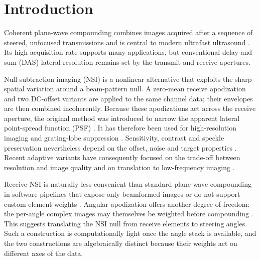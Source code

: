 \documentclass{iopjournal}
\providecommand{\revstart}{}
\providecommand{\revstop}{}
\begin{document}
\vspace{0.2cm}
\par\medskip

\section{Introduction}

Coherent plane-wave compounding combines images acquired after a sequence of
steered, unfocused transmissions and is central to modern ultrafast ultrasound
\citep{montaldo2009coherent,tanter2014ultrafast}. Its high acquisition rate
supports many applications, but conventional delay-and-sum (DAS)
\revstart lateral\revstop{} resolution remains set by the transmit and receive
apertures.

Null subtraction imaging (NSI) is a nonlinear alternative that exploits the
sharp spatial variation around a beam-pattern null. A zero-mean receive
apodization and two DC-offset variants are applied to the same channel data;
their envelopes are then combined incoherently. Because these apodizations act
across the receive aperture, the original method was introduced to narrow the
apparent lateral point-spread function (PSF) \citep{reeg_improving_2015,agarwal2019improving}. It has therefore been used for
high-resolution imaging and grating-lobe suppression
\citep{kou2022grating,gardner2024gratinglobe,kou_detection_2023,
kou2024highresolution}. Sensitivity, contrast and speckle preservation
nevertheless depend on the offset, noise and target properties
\citep{agarwal2019improving,kou2024highresolution}. Recent adaptive variants
have consequently focused on the trade-off between resolution and image quality
\citep{xu2026regionadaptive,yang2026generalized} and on translation to
low-frequency imaging \citep{xu_frame_2024,xu_null_2025}.

\revstart Receive-NSI\revstop{} is naturally less convenient than standard
plane-wave compounding in software pipelines that expose only beamformed images
or do not support custom element weights
\citep{garcia2021must,guan_mach_2026}. Angular apodization offers another degree
of freedom: the per-angle complex images may themselves be weighted before
compounding \citep{rodriguez-molares_angular_2015}. This suggests translating
the NSI null from receive elements to steering angles. Such a construction is
computationally light once the angle stack is available, and the two
constructions are algebraically distinct because their weights act on different
axes of the data.
\end{document}
